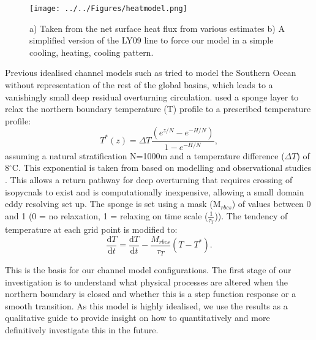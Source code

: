 \begin{figure}[h]
\center
\noindent \texttt{[image: ../../Figures/heatmodel.png]} 
\caption{a) Taken from \protect \cite{cerovecki2011} the net surface heat flux from various estimates b) A simplified version of the LY09 line \protect \citep{Large2009} to force our model in a simple cooling, heating, cooling pattern.}
\label{fig:modelQ}
\end{figure}

Previous idealised channel models such as \cite{cerovevcki2009,cessi2006} tried to model the Southern Ocean without representation of the rest of the global basins, which leads to a vanishingly small deep residual overturning circulation. \citet{Abernathey2011} used a sponge layer to relax the northern boundary temperature (T) profile to a prescribed temperature profile:
\begin{equation} 
T^*(z)=\Delta T\frac{(e^{z/N}-e^{-H/N})}{1-e^{-H/N}} ,
\label{eq:tprof}
\end{equation} 
assuming a natural stratification N=1000m and a temperature difference ($\Delta T$) of 8$^{\circ}$C. This exponential is taken from \citet{Abernathey2011} based on modelling and observational studies \citep{karsten2002,wolfe2008}. %
  This allows a return pathway for deep overturning that requires crossing of isopycnals to exist and is computationally inexpensive, allowing a small domain eddy resolving set up. The sponge is set using a mask (M$_{rbcs}$) of values between 0 and 1 (0 = no relaxation, 1 = relaxing on time scale ($\displaystyle{\frac{1}{\tau_{T}}}$)). The tendency of temperature at each grid point is modified to:
\begin{equation}
\frac{\mathrm{d}T}{\mathrm{d}t}=\frac{\mathrm{d}T}{\mathrm{d}t}-\frac{M_{rbcs}}{\tau_{T}}(T-T^*).
\end{equation}

This is the basis for our channel model configurations. The first stage of our investigation is to understand what physical processes are altered when the northern boundary is closed and whether this is a step function response or a smooth transition. As this model is highly idealised, we use the results as a qualitative guide to provide insight on how to quantitatively and more definitively investigate this in the future.